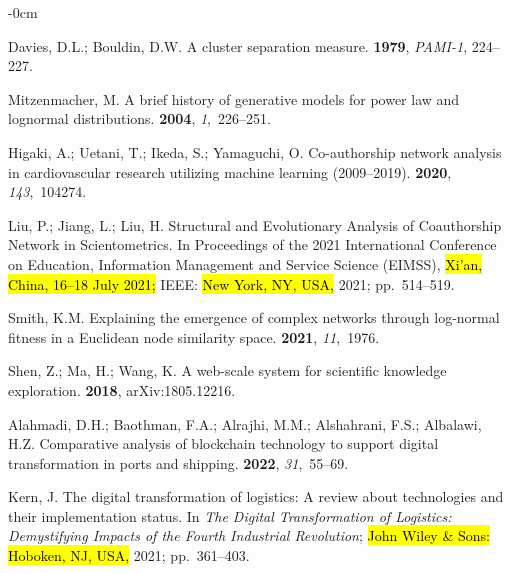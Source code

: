 \documentclass[jmse,review,accept,pdftex,moreauthors]{Definitions/mdpi}
\begin{document}
\begin{adjustwidth}{-\extralength}{0cm}
\begin{thebibliography}{999}
Davies, D.L.; Bouldin, D.W.
\newblock A cluster separation measure.
  {\bf 1979}, \emph{PAMI-1}, 224--227.

Mitzenmacher, M.
\newblock A brief history of generative models for power law and lognormal
  distributions.
 {\bf 2004}, {\em 1},~226--251.

Higaki, A.; Uetani, T.; Ikeda, S.; Yamaguchi, O.
\newblock Co-authorship network analysis in cardiovascular research utilizing
  machine learning (2009--2019).
 {\bf 2020}, {\em
  143},~104274.

Liu, P.; Jiang, L.; Liu, H.
\newblock Structural and Evolutionary Analysis of Coauthorship Network in
  Scientometrics.
\newblock In Proceedings of the 2021 International Conference on Education,
  Information Management and Service Science (EIMSS), \hl{Xi'an, China, 16--18 July 2021;} IEEE: \hl{New York, NY, USA,} 2021; \mbox{pp.  514--519.}

Smith, K.M.
\newblock Explaining the emergence of complex networks through log-normal
  fitness in a Euclidean node similarity space.
 {\bf 2021}, {\em 11},~1976.

Shen, Z.; Ma, H.; Wang, K.
\newblock A web-scale system for scientific knowledge exploration.
 {\bf 2018}, arXiv:1805.12216.

Alahmadi, D.H.; Baothman, F.A.; Alrajhi, M.M.; Alshahrani, F.S.; Albalawi, H.Z.
\newblock Comparative analysis of blockchain technology to support digital
  transformation in ports and shipping.
 {\bf 2022}, {\em 31},~55--69.

Kern, J.
\newblock The digital transformation of logistics: A review about technologies
  and their implementation status.
\newblock In {\em The Digital Transformation of Logistics: Demystifying Impacts of
  the Fourth Industrial Revolution}; \hl{John Wiley \& Sons:  Hoboken, NJ, USA,} 2021; \mbox{pp. 361--403.}


\end{thebibliography}
\end{adjustwidth}
\end{document}
